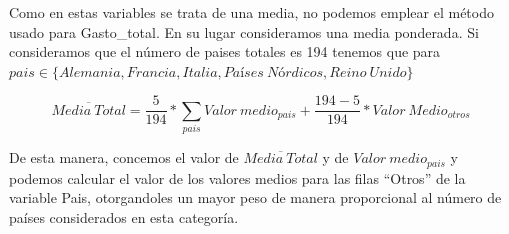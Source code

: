 \documentclass[data,article,submit,moreauthors,pdftex]{Definitions/mdpi}
\newenvironment{Shaded}{\begin{snugshade}}{\end{snugshade}}
\newcommand{\CommentTok}[1]{\textcolor[rgb]{0.56,0.35,0.01}{\textit{#1}}}
\newcommand{\ControlFlowTok}[1]{\textcolor[rgb]{0.13,0.29,0.53}{\textbf{#1}}}
\newcommand{\DecValTok}[1]{\textcolor[rgb]{0.00,0.00,0.81}{#1}}
\newcommand{\FunctionTok}[1]{\textcolor[rgb]{0.13,0.29,0.53}{\textbf{#1}}}
\newcommand{\NormalTok}[1]{#1}
\newcommand{\OtherTok}[1]{\textcolor[rgb]{0.56,0.35,0.01}{#1}}
\newcommand{\SpecialCharTok}[1]{\textcolor[rgb]{0.81,0.36,0.00}{\textbf{#1}}}
\newcommand{\StringTok}[1]{\textcolor[rgb]{0.31,0.60,0.02}{#1}}
\begin{document}
Como en estas variables se trata de una media, no podemos emplear el
método usado para Gasto\_total. En su lugar consideramos una media
ponderada. Si consideramos que el número de paises totales es 194
tenemos que para
\(pais \in \{Alemania, Francia,Italia, Países\ Nórdicos, Reino\ Unido\}\)

\[
 \overline{Media\ Total} = \frac{5}{194}*\sum_{pais}{Valor\ medio}_{pais} + \frac{194-5}{194}*Valor \ Medio_{otros}
\]

De esta manera, concemos el valor de \(\overline{Media\ Total}\) y de
\({Valor\ medio}_{pais}\) y podemos calcular el valor de los valores
medios para las filas ``Otros'' de la variable Pais, otorgandoles un
mayor peso de manera proporcional al número de países considerados en
esta categoría.

\begin{Shaded}
\end{Shaded}
\end{document}
